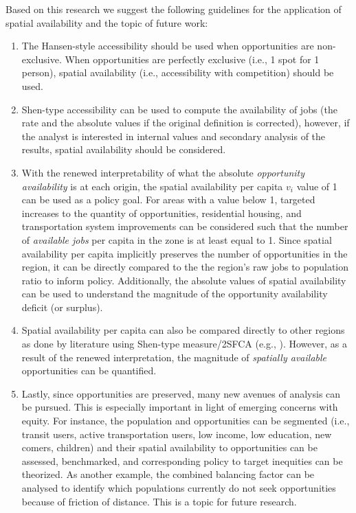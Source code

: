 \documentclass[]{elsarticle} %
\begin{document}
Based on this research we suggest the following guidelines for the
application of spatial availability and the topic of future work:

\begin{enumerate}
\def\labelenumi{\arabic{enumi})}
\item
  The Hansen-style accessibility should be used when opportunities are
  non-exclusive. When opportunities are perfectly exclusive (i.e., 1
  spot for 1 person), spatial availability (i.e., accessibility with
  competition) should be used.
\item
  Shen-type accessibility can be used to compute the availability of
  jobs (the rate and the absolute values if the original definition is
  corrected), however, if the analyst is interested in internal values
  and secondary analysis of the results, spatial availability should be
  considered.
\item
  With the renewed interpretability of what the absolute
  \emph{opportunity availability} is at each origin, the spatial
  availability per capita \(v_i\) value of 1 can be used as a policy
  goal. For areas with a value below 1, targeted increases to the
  quantity of opportunities, residential housing, and transportation
  system improvements can be considered such that the number of
  \emph{available jobs} per capita in the zone is at least equal to 1.
  Since spatial availability per capita implicitly preserves the number
  of opportunities in the region, it can be directly compared to the the
  region's raw jobs to population ratio to inform policy. Additionally,
  the absolute values of spatial availability can be used to understand
  the magnitude of the opportunity availability deficit (or surplus).
\item
  Spatial availability per capita can also be compared directly to other
  regions as done by literature using Shen-type measure/2SFCA (e.g.,
  \citet{giannotti_inequalities_2021}). However, as a result of the
  renewed interpretation, the magnitude of \emph{spatially available}
  opportunities can be quantified.
\item
  Lastly, since opportunities are preserved, many new avenues of
  analysis can be pursued. This is especially important in light of
  emerging concerns with equity. For instance, the population and
  opportunities can be segmented (i.e., transit users, active
  transportation users, low income, low education, new comers, children)
  and their spatial availability to opportunities can be assessed,
  benchmarked, and corresponding policy to target inequities can be
  theorized. As another example, the combined balancing factor can be
  analysed to identify which populations currently do not seek
  opportunities because of friction of distance. This is a topic for
  future research.
\end{enumerate}
\end{document}

